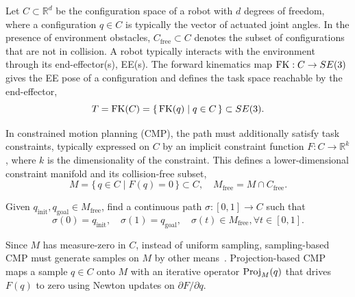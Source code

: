 \documentclass[letterpaper, 10 pt, conference]{ieeeconf}
\begin{document}
Let $C \subset \mathbb{R}^d$ be the configuration space of a robot with $d$ degrees of freedom, where a configuration $q \in C$ is typically the vector of actuated joint angles.
In the presence of environment obstacles, $C_\text{free} \subset C$ denotes the subset of configurations that are not in collision.
A robot typically interacts with the environment through its end-effector(s), EE(s).
The forward kinematics map $\operatorname{FK} : C \to SE(3)$ gives the EE pose of a configuration and defines the task space reachable by the end-effector,
\begin{equation*}
  T = \operatorname{FK}(C) = \{\, \operatorname{FK}(q) \mid q \in C \,\} \subset SE(3).
\end{equation*}

In constrained motion planning (CMP), the path must additionally satisfy task constraints, typically expressed on $C$ by an implicit constraint function $F : C \to \mathbb{R}^k$, where $k$ is the dimensionality of the constraint.
This defines a lower-dimensional constraint manifold and its collision-free subset,
\begin{equation*}
  M = \{\, q \in C \mid F(q) = 0 \,\} \subset C, \quad
  M_\text{free} = M \cap C_\text{free}.
\end{equation*}

\begin{definition}\label{def:cmp}
Given $q_\text{init}, q_\text{goal} \in M_\text{free}$, find a continuous path $\sigma : [0,1] \to C$ such that
\begin{equation*}
  \sigma(0) = q_\text{init}, \quad
  \sigma(1) = q_\text{goal}, \quad
  \sigma(t) \in M_\text{free}, \forall t \in [0,1].
\end{equation*}
\end{definition}

Since $M$ has measure-zero in $C$, instead of uniform sampling, sampling-based CMP must generate samples on $M$ by other means~\cite{kingston2018sampling}.
Projection-based CMP~\cite{berenson2009manipulation} maps a sample $q \in C$ onto $M$ with an iterative operator $\operatorname{Proj}_M(q)$ that drives $F(q)$ to zero using Newton updates on $\partial F / \partial q$.
\end{document}
